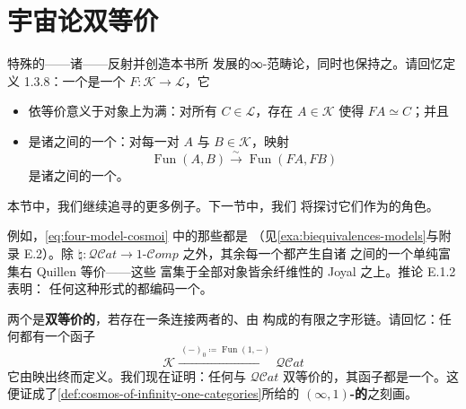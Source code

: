 \providecommand{\Fun}{\operatorname{Fun}}
\providecommand{\QCat}{\mathcal{Q}\mathcal{C}at}

\section{宇宙论双等价}\label{sec:cosmological-biequivalences}

特殊的\trCosmologicalFunctor{}——诸\trBiequivalence{}——反射并创造本书所%
发展的∞-范畴论，同时也保持之。请回忆定义 1.3.8：一个\textbf{\trCosmologicalBiequivalence}是一个\trCosmologicalFunctor{} $F\colon\mathcal{K}\to\mathcal{L}$，它
\begin{itemize}
\item 依等价意义于对象上为满：对所有 $C\in\mathcal{L}$，存在 $A\in\mathcal{K}$%
使得 $FA\simeq C$；并且
\item 是诸\trQuasiCategory{}之间的一个\trLocalEquivalence：对每一对 $A$ 与 $B\in\mathcal{K}$，映射
\begin{equation*}
\Fun(A,B)\xrightarrow{\ \sim\ }\Fun(FA,FB)
\end{equation*}
是诸\trQuasiCategory{}之间的一个\trEquivalence。
\end{itemize}

本节中，我们继续追寻\trCosmologicalBiequivalence{}的更多例子。下一节中，我们%
将探讨它们作为\trChangeOfModel{}\trFunctor{}的角色。

例如，\eqref{eq:four-model-cosmoi} 中的那些\trFunctor{}都是\trBiequivalence%
（见\cref{exa:biequivalences-models}与附录 E.2）。除\trFunctor{}%
$\natural\colon\QCat\to 1\text{-}\mathcal{C}omp$ 之外，其余每一个都产生自诸%
\trModelCategory{}之间的一个单纯富集右 Quillen 等价——这些\trModelCategory{}%
富集于全部对象皆余纤维性的 Joyal \trModelStructure{}之上。推论 E.1.2 表明：%
任何这种形式的\trFunctor{}都编码一个\trCosmologicalBiequivalence。

两个\trInfinityCosmos{}是\textbf{双等价的}，若存在一条连接两者的、由%
\trBiequivalence{}构成的有限之字形链。请回忆：任何\trInfinityCosmos{}都有一个\trUnderlyingQuasiCategory{}函子
\begin{equation*}
\mathcal{K}\xrightarrow{\ (-)_{0}\coloneqq\Fun(1,-)\ }\QCat
\end{equation*}
它由映出终\trInfinityCategory{}而定义。我们现在证明：任何与 $\QCat$ 双等价的\trInfinityCosmos{}，其\trUnderlyingQuasiCategory{}函子都是一个\trCosmologicalBiequivalence。这便证成了\cref{def:cosmos-of-infinity-one-categories}所给的 \textbf{$(\infty,1)$-\trCategory{}的\trInfinityCosmos}之刻画。

